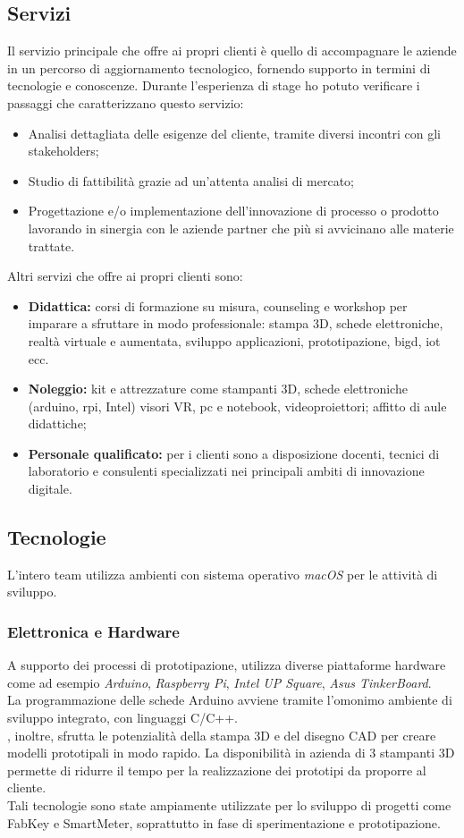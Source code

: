 \subsection{Servizi}
Il servizio principale che \lab{} offre ai propri clienti è quello di accompagnare le aziende in un percorso di aggiornamento tecnologico, fornendo supporto in termini di tecnologie e conoscenze.
Durante l'esperienza di stage ho potuto verificare i passaggi che caratterizzano questo servizio:
\begin{itemize}
\item Analisi dettagliata delle esigenze del cliente, tramite diversi incontri con gli stakeholders;
\item Studio di fattibilità grazie ad un'attenta analisi di mercato;
\item Progettazione e/o implementazione dell'innovazione di processo o prodotto lavorando in sinergia con le aziende partner che più si avvicinano alle materie trattate.
\end{itemize}
Altri servizi che \lab{} offre ai propri clienti sono:
\begin{itemize}
\item \textbf{Didattica:} corsi di formazione su misura, \gls{counseling} e \gls{workshop} per imparare a sfruttare in modo professionale: stampa 3D, schede elettroniche, realtà virtuale e aumentata, sviluppo applicazioni, prototipazione, \gls{bigd}, \gls{iot} ecc.
\item \textbf{Noleggio:} kit e attrezzature come stampanti 3D, schede elettroniche (\gls{arduino}, \gls{rpi}, Intel) visori VR, pc e notebook, videoproiettori; affitto di aule didattiche;
\item \textbf{Personale qualificato:} per i clienti sono a disposizione docenti, tecnici di laboratorio e consulenti specializzati nei principali ambiti di innovazione digitale.
\end{itemize}

\subsection{Tecnologie}
L'intero team utilizza ambienti con sistema operativo \textit{macOS} per le attività di sviluppo. 
\subsubsection{Elettronica e Hardware}
A supporto dei processi di prototipazione, \lab{} utilizza diverse piattaforme hardware come ad esempio \textit{Arduino}, \textit{Raspberry Pi}, \textit{Intel UP Square}, \textit{Asus TinkerBoard}.\\
La programmazione delle schede Arduino avviene tramite l'omonimo ambiente di sviluppo integrato, con linguaggi C/C++.\\
\lab{}, inoltre, sfrutta le potenzialità della stampa 3D e del disegno CAD per creare modelli prototipali in modo rapido. La disponibilità in azienda di 3 stampanti 3D permette di ridurre il tempo per la realizzazione dei prototipi da proporre al cliente.\\
Tali tecnologie sono state ampiamente utilizzate per lo sviluppo di progetti come FabKey e SmartMeter, soprattutto in fase di sperimentazione e prototipazione.

